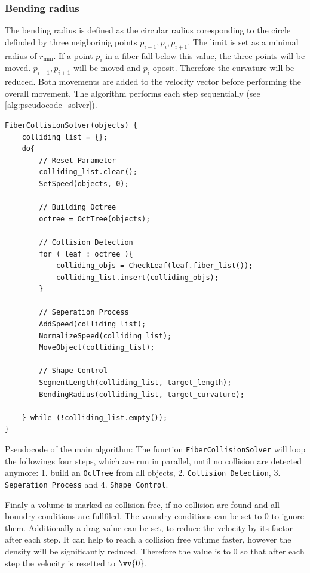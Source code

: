 \subsubsection{Bending radius}
The bending radius is defined as the circular radius coresponding to the circle definded by three neigborinig points $p_{i-1}, p_{i}, p_{i+1}$. 
The limit is set as a minimal radius of $r_{\min}$. If a point $p_{i}$ in a fiber fall below this value, the three points will be moved. $p_{i-1},p_{i+1}$ will be moved \dummy and $p_{i}$ oposit. Therefore the curvature will be reduced.
% 
\newline
Both movements are added to the velocity vector before performing the overall movement.
The algorithm performs each step sequentially (see \cref{alg:pseudocode_solver}).
\begin{lstfloat}[!tb]

\begin{lstlisting}[]
FiberCollisionSolver(objects) {
	colliding_list = {};
	do{
		// Reset Parameter
		colliding_list.clear();
		SetSpeed(objects, 0);
		
		// Building Octree
		octree = OctTree(objects);
		
		// Collision Detection
		for ( leaf : octree ){
			colliding_objs = CheckLeaf(leaf.fiber_list());
			colliding_list.insert(colliding_objs);
		}
		
		// Seperation Process
		AddSpeed(colliding_list);
		NormalizeSpeed(colliding_list);
		MoveObject(colliding_list);
		
		// Shape Control
		SegmentLength(colliding_list, target_length);
		BendingRadius(colliding_list, target_curvature);
		
	} while (!colliding_list.empty());
}
\end{lstlisting}
\caption{Pseudocode of the main algorithm: The function \texttt{FiberCollisionSolver} will loop the followings four steps, which are run in parallel, until no collision are detected anymore: 1. build an \texttt{OctTree} from all objects, 2. \texttt{Collision Detection}, 3. \texttt{Seperation Process} and 4. \texttt{Shape Control}.}
\label{alg:pseudocode_solver}
\end{lstfloat}
% 
Finaly a volume is marked as collision free, if no collision are found and all boundry conditions are fullfiled. 
The voundry conditions can be set to 0 to ignore them.
Additionally a drag value can be set, to reduce the velocity by its factor after each step.
It can help to reach a collision free volume faster, however the density will be significantly reduced.
Therefore the value is to 0 so that after each step the velocity is resetted to $\vv{0}$. 
% 
%
% 
% 
